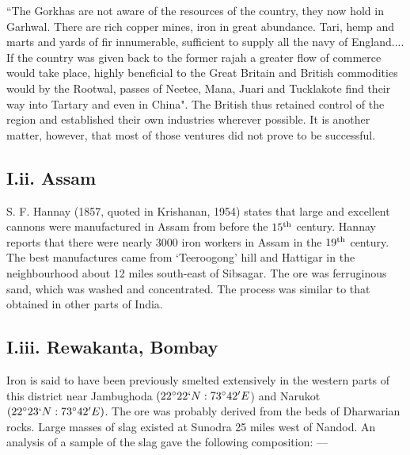 {\footnotesize{``The Gorkhas are not aware of the resources of the country, they now hold in Garhwal. There are rich copper mines, iron in great abundance. Tari, hemp and marts and yards of fir innumerable, sufficient to supply all the navy of England.... If the country was given back to the former rajah a greater flow of commerce would take place, highly beneficial to the Great Britain and British commodities would by the Rootwal, passes of Neetee, Mana, Juari and Tucklakote find their way into Tartary and even in China".}} The British thus retained control of the region and established their own industries wherever possible. It is another matter, however, that most of those ventures did not prove to be successful.

\vspace{-.5cm}

\subsection*{I.ii. Assam}\label{subsection-2}

\vspace{-.3cm}

S. F. Hannay (1857, quoted in Krishanan, 1954) states that large and excellent cannons were manufactured in Assam from before the $15^{\rm th}$ century. Hannay reports that there were nearly 3000 iron workers in Assam in the $19^{\rm th}$ century. The best manufactures came from ‘Teeroogong’ hill and Hattigar in the neighbourhood about 12 miles south-east of Sibsagar. The ore was ferruginous sand, which was washed and concentrated. The process was similar to that obtained in other parts of India.

\vspace{-.3cm}

\subsection*{I.iii. Rewakanta, Bombay}\label{subsection-3}

\vspace{-.3cm}

Iron is said to have been previously smelted extensively in the western parts of this district near Jambughoda $(22^\circ 22`N: 73^\circ 42'E$) and Narukot $(22^\circ 23` N: 73^\circ 42' E)$. The ore was probably derived from the beds of Dharwarian rocks. Large masses of slag existed at Sunodra 25 miles west of Nandod. An analysis of a sample of the slag gave the following composition: —

